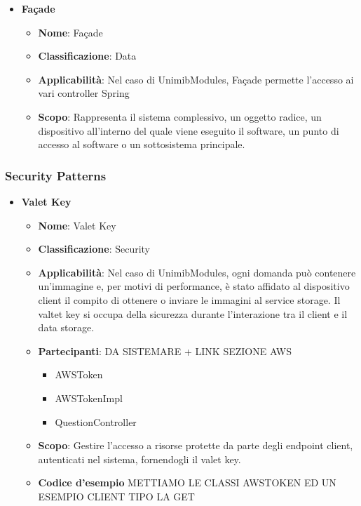 \documentclass[12pt]{article}
\begin{document}
\begin{itemize}
		
		\item \textbf{Façade}
		\begin{itemize}
		\item \textbf{Nome}: Façade
            \item \textbf{Classificazione}: Data
            \item \textbf{Applicabilità}: Nel caso di UnimibModules, Façade permette l'accesso ai vari controller Spring
            \item \textbf{Scopo}: Rappresenta il sistema complessivo, un oggetto radice, un dispositivo all’interno del quale viene eseguito il software, un punto di accesso al software o un sottosistema principale.
        \end{itemize}
	\end{itemize}
	
\subsubsection{Security Patterns}
	\begin{itemize}
		\item \textbf{Valet Key}
    	\begin{itemize}
            \item \textbf{Nome}: Valet Key
            \item \textbf{Classificazione}: Security
            \item \textbf{Applicabilità}: Nel caso di UnimibModules, ogni domanda può contenere un'immagine e, per motivi di performance, è stato affidato al dispositivo client il compito di ottenere o inviare le immagini al service storage. Il valtet key si occupa della sicurezza durante l'interazione tra il client e il data storage.
            \item \textbf{Partecipanti}: DA SISTEMARE + LINK SEZIONE AWS
                \begin{itemize}
                    \item {AWSToken}
                    \item {AWSTokenImpl}
                    \item {QuestionController}
                \end{itemize}
            \item \textbf{Scopo}: Gestire l'accesso a risorse protette da parte degli endpoint client, autenticati nel sistema, fornendogli il valet key.
             \item \textbf{Codice d'esempio} METTIAMO LE CLASSI AWSTOKEN ED UN ESEMPIO CLIENT TIPO LA GET
             
             \end{itemize}
             \end{itemize}
             
\end{document}
